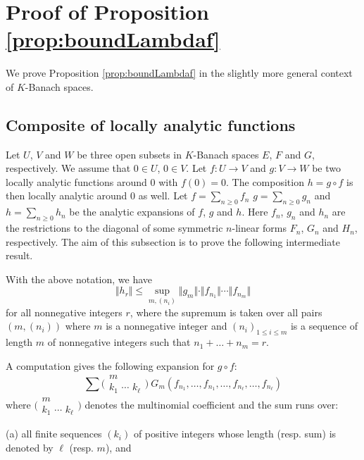 \documentclass{sig-alternate-2013}
\def\binom#1#2{\Big(\begin{array}{cc} #1 \\ #2 \end{array}\Big)}
\begin{document}
\appendix

\section{Proof of Proposition \ref{prop:boundLambdaf}}
\label{app:proof}

We prove Proposition \ref{prop:boundLambdaf} in the slightly more
general context of $K$-Banach spaces.

\subsection{Composite of locally analytic functions}

Let $U$, $V$ and $W$ be three open subsets in $K$-Banach spaces 
$E$, $F$ and $G$, respectively. We assume that $0 \in U$, $0 \in V$. Let 
$f : U \to V$ and $g : V \to W$ be two locally analytic functions around 
$0$ with $f(0) = 0$. The composition $h = g \circ f$ is then locally 
analytic around $0$ as well. Let $f = \sum_{n \geq 0} f_n$
$g = \sum_{n \geq 0} g_n$ and $h = \sum_{n \geq 0} h_n$ be the
analytic expansions of $f$, $g$ and $h$.
Here $f_n$, $g_n$ and $h_n$ are the restrictions to the diagonal of 
some symmetric $n$-linear forms $F_n$, $G_n$ and $H_n$, respectively. The 
aim of this subsection is to prove the following intermediate result.

\begin{prop}
\label{prop:boundhr}
With the above notation, we have
$$\Vert h_r \Vert \leq \sup_{m, (n_i)}
  \Vert g_m \Vert \cdot \Vert f_{n_1} \Vert \cdots \Vert f_{n_m} \Vert$$
for all nonnegative integers $r$, where the supremum is taken over all pairs $(m, (n_i))$ where $m$
is a nonnegative integer and $(n_i)_{1 \leq i \leq m}$ is a sequence of
length $m$ of nonnegative integers such that $n_1 + \ldots + n_m = r$.
\end{prop}

A computation gives the following expansion for $g \circ f$:
\begin{equation}
\label{eq:expansiongf}
\sum \binom m {\!k_1 \,\, \cdots \,\, k_\ell\!} \:
G_m(f_{n_1}, \ldots, f_{n_1}, \ldots, f_{n_\ell}, \ldots, f_{n_\ell})
\end{equation}
where $\binom m {\!k_1 \,\, \cdots \,\, k_\ell\!}$ denotes the
multinomial coefficient and the sum runs over:

\noindent
(a) all finite sequences $(k_i)$ of positive integers whose length 
(resp. sum) is denoted by $\ell$ (resp. $m$), and
\end{document}
